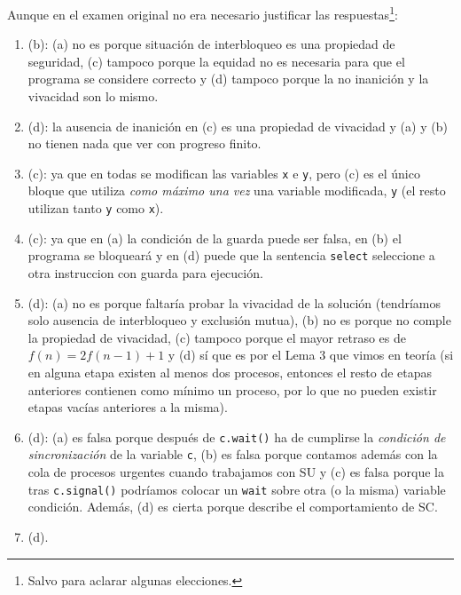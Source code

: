 \documentclass[12pt]{article}
\begin{document}
    \begin{ejercicio}
        Aunque en el examen original no era necesario justificar las respuestas\footnote{Salvo para aclarar algunas elecciones.}:
        \begin{enumerate}
            \item (b): (a) no es porque situación de interbloqueo es una propiedad de seguridad, (c) tampoco porque la equidad no es necesaria para que el programa se considere correcto y (d) tampoco porque la no inanición y la vivacidad son lo mismo.
            \item (d): la ausencia de inanición en (c) es una propiedad de vivacidad y (a) y (b) no tienen nada que ver con progreso finito.
            \item (c): ya que en todas se modifican las variables \verb|x| e \verb|y|, pero (c) es el único bloque que utiliza \textit{como máximo una vez} una variable modificada, \verb|y| (el resto utilizan tanto \verb|y| como \verb|x|).
            \item (c): ya que en (a) la condición de la guarda puede ser falsa, en (b) el programa se bloqueará y en (d) puede que la sentencia \verb|select| seleccione a otra instruccion con guarda para ejecución.
            \item (d): (a) no es porque faltaría probar la vivacidad de la solución (tendríamos solo ausencia de interbloqueo y exclusión mutua), (b) no es porque no comple la propiedad de vivacidad, (c) tampoco porque el mayor retraso es de $f(n) = 2f(n-1)+1$ y (d) sí que es por el Lema 3 que vimos en teoría (si en alguna etapa existen al menos dos procesos, entonces el resto de etapas anteriores contienen como mínimo un proceso, por lo que no pueden existir etapas vacías anteriores a la misma).
            \item (d): (a) es falsa porque después de \verb|c.wait()| ha de cumplirse la \textit{condición de sincronización} de la variable \verb|c|, (b) es falsa porque contamos además con la cola de procesos urgentes cuando trabajamos con SU y (c) es falsa porque la tras \verb|c.signal()| podríamos colocar un \verb|wait| sobre otra (o la misma) variable condición. Además, (d) es cierta porque describe el comportamiento de SC\@.
            \item (d).
        \end{enumerate}
    \end{ejercicio}
\end{document}
